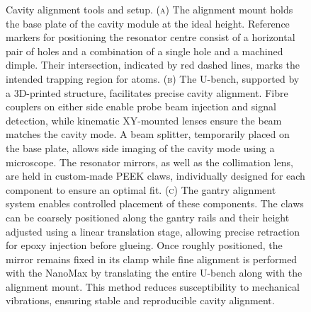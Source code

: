 \documentclass[../Thesis-IJspeert.tex]{subfiles}
\begin{document}
\begin{figure}[t]
\caption[Cavity alignment tools and setup]{Cavity alignment tools and setup. (\textsc{a}) The alignment mount holds the base plate of the cavity module at the ideal height. Reference markers for positioning the resonator centre consist of a horizontal pair of holes and a combination of a single hole and a machined dimple. Their intersection, indicated by red dashed lines, marks the intended trapping region for atoms. (\textsc{b}) The U-bench, supported by a 3D-printed structure, facilitates precise cavity alignment. Fibre couplers on either side enable probe beam injection and signal detection, while kinematic XY-mounted lenses ensure the beam matches the cavity mode. A beam splitter, temporarily placed on the base plate, allows side imaging of the cavity mode using a microscope. The resonator mirrors, as well as the collimation lens, are held in custom-made PEEK claws, individually designed for each component to ensure an optimal fit. (\textsc{c}) The gantry alignment system enables controlled placement of these components. The claws can be coarsely positioned along the gantry rails and their height adjusted using a linear translation stage, allowing precise retraction for epoxy injection before glueing. Once roughly positioned, the mirror remains fixed in its clamp while fine alignment is performed with the NanoMax by translating the entire U-bench along with the alignment mount. This method reduces susceptibility to mechanical vibrations, ensuring stable and reproducible cavity alignment.}
\label{ubenchgantry}
\end{figure}
\end{document}
